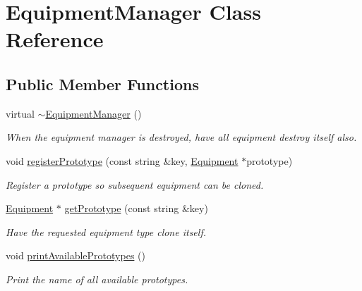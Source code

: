 \hypertarget{class_equipment_manager}{}\section{Equipment\+Manager Class Reference}
\label{class_equipment_manager}
\subsection*{Public Member Functions}
\begin{DoxyCompactItemize}
\item 
\hypertarget{class_equipment_manager_a8cf5a5bb4da177e2323df46372a02f78}{}virtual \hyperlink{class_equipment_manager_a8cf5a5bb4da177e2323df46372a02f78}{$\sim$\+Equipment\+Manager} ()\label{class_equipment_manager_a8cf5a5bb4da177e2323df46372a02f78}

\begin{DoxyCompactList}\small\item\em When the equipment manager is destroyed, have all equipment destroy itself also. \end{DoxyCompactList}\item 
\hypertarget{class_equipment_manager_ae4a2d6042ec154263cc69227fd80237d}{}void \hyperlink{class_equipment_manager_ae4a2d6042ec154263cc69227fd80237d}{register\+Prototype} (const string \&key, \hyperlink{class_equipment}{Equipment} $\ast$prototype)\label{class_equipment_manager_ae4a2d6042ec154263cc69227fd80237d}

\begin{DoxyCompactList}\small\item\em Register a prototype so subsequent equipment can be cloned. \end{DoxyCompactList}\item 
\hypertarget{class_equipment_manager_a646da096ab0d5a52eeb925c871c59067}{}\hyperlink{class_equipment}{Equipment} $\ast$ \hyperlink{class_equipment_manager_a646da096ab0d5a52eeb925c871c59067}{get\+Prototype} (const string \&key)\label{class_equipment_manager_a646da096ab0d5a52eeb925c871c59067}

\begin{DoxyCompactList}\small\item\em Have the requested equipment type clone itself. \end{DoxyCompactList}\item 
\hypertarget{class_equipment_manager_aad2e6bc9c428ad79f4b4edbf9243cabc}{}void \hyperlink{class_equipment_manager_aad2e6bc9c428ad79f4b4edbf9243cabc}{print\+Available\+Prototypes} ()\label{class_equipment_manager_aad2e6bc9c428ad79f4b4edbf9243cabc}

\begin{DoxyCompactList}\small\item\em Print the name of all available prototypes. \end{DoxyCompactList}\end{DoxyCompactItemize}


